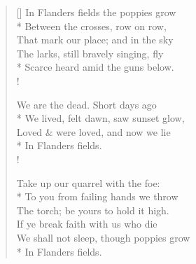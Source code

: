 \documentclass[MAIN]{subfiles}
\begin{document}
\settowidth{\versewidth}{In Flanders fields the poppies grow}
\begin{verse}[\versewidth]
In Flanders fields the poppies grow\\*
Between the crosses, row on row,\\
\vin That mark our place; and in the sky\\
\vin The larks, still bravely singing, fly\\*
Scarce heard amid the guns below.\\!

We are the dead. Short days ago\\*
We lived, felt dawn, saw sunset glow,\\
\vin Loved \& were loved, and now we lie\\*
\vin \vin \vin In Flanders fields.\\!

Take up our quarrel with the foe:\\*
To you from failing hands we throw\\
\vin The torch; be yours to hold it high.\\
\vin If ye break faith with us who die\\
We shall not sleep, though poppies grow\\*
\vin \vin \vin In Flanders fields.
\end{verse}
\end{document}
